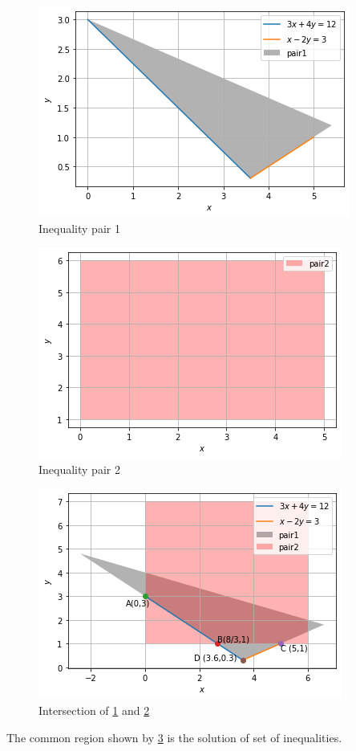 \documentclass[journal,12pt,twocolumn]{IEEEtran}
\begin{document}
\begin{figure}[!ht]
\centering
\includegraphics[width=\columnwidth]{Figure9_1}
\caption{Inequality pair 1}
\label{fig:inequalities1}	
\end{figure}
\begin{figure}[!ht]
\centering
\includegraphics[width=\columnwidth]{Figure9_2}
\caption{Inequality pair 2}
\label{fig:inequalities2}	
\end{figure}
\begin{figure}[!ht]
\centering
\includegraphics[width=\columnwidth]{Figure9_3}
\caption{Intersection of \ref{fig:inequalities1} and \ref{fig:inequalities2}}
\label{fig:inequality3}	
\end{figure}
The common region shown by \ref{fig:inequality3} is the solution of set of inequalities.
\end{document}
